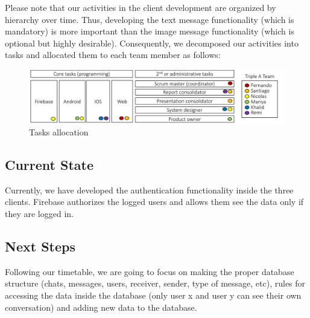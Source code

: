 Please note that our activities in the client development are organized by hierarchy over time. Thus, developing the text message functionality (which is mandatory) is more important than the image message functionality (which is optional but highly desirable). Consequently, we decomposed our activities into tasks and allocated them to each team member as follows:

\begin{figure}[ht]
\centering
\includegraphics[width=1\textwidth]{figs/tasks}
	\caption{Tasks allocation}
	\label{fig:Tasks}
\end{figure}

\subsection{Current State}
Currently, we have developed the authentication functionality inside the three clients. Firebase authorizes the logged users and allows them see the data only if they are logged in.

\subsection{Next Steps}
Following our timetable, we are going to focus on making the proper database structure (chats, messages, users, receiver, sender, type of message, etc), rules for accessing the data inside the database (only user x and user y can see their own conversation) and adding new data to the database.